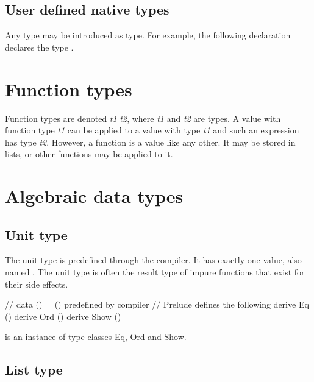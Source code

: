 \subsection{User defined native types}

Any \java{} type may be introduced as \frege{} type. For example, the
following declaration  declares the
\frege{} type .


\section{Function types}

Function types are denoted
{\it t1} \arrow{} {\it t2},
where {\it t1} and
{\it t2} are types. A value with function type {\it t1}
 can be applied to a
value with type {\it t1} and such an expression has type {\it
t2}. However, a function is a value like any other. It may be
stored in lists, or other functions may be applied to it.

\section{Algebraic data types}


\subsection{Unit type} \label{unittype}

The unit type \sym{()} is predefined through the compiler. It has exactly one value, also named \sym{()}. The unit type is often the result type of impure functions that exist for their side effects.

\begin{code}
    // data () = ()      predefined by compiler
    // Prelude defines the following
    derive Eq ()
    derive Ord ()
    derive Show ()
\end{code}

\sym{()} is an instance of type classes Eq, Ord and Show.

\subsection{List type} \label{listtype} 

